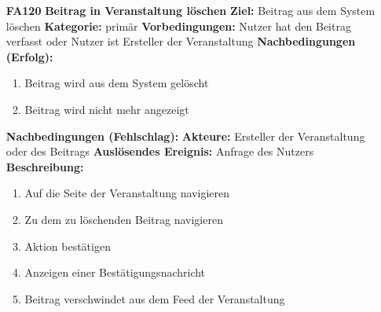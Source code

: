 \documentclass[parskip=full]{scrartcl}
\begin{document}
\begin{itemize}[nosep]
			\item[\textbf{FA120}]\textbf{Beitrag in Veranstaltung löschen}	
				\newline \textbf{Ziel:} Beitrag aus dem System löschen
				\newline \textbf{Kategorie:} primär
				\newline \textbf{Vorbedingungen:} Nutzer hat den Beitrag verfasst oder Nutzer ist Ersteller der Veranstaltung
				\newline \textbf{Nachbedingungen (Erfolg):} 
				\begin{enumerate}[nosep]
					\item Beitrag wird aus dem System gelöscht
					\item Beitrag wird nicht mehr angezeigt 
				\end{enumerate}
				\textbf{Nachbedingungen (Fehlschlag):}
				\newline \textbf{Akteure:} Ersteller der Veranstaltung oder des Beitrags
				\newline \textbf{Auslösendes Ereignis:} Anfrage des Nutzers
				\newline \textbf{Beschreibung:}
				\begin{enumerate}[nosep]
					\item Auf die Seite der Veranstaltung navigieren
					\item Zu dem zu löschenden Beitrag navigieren
					\item Aktion bestätigen
					\item Anzeigen einer Bestätigungsnachricht
					\item Beitrag verschwindet aus dem Feed der Veranstaltung\\
				\end{enumerate}
			

\end{itemize}
\end{document}
